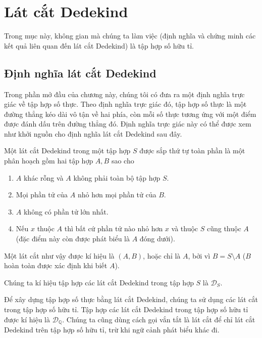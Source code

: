 \section{Lát cắt Dedekind}

Trong mục này, không gian mà chúng ta làm việc (định nghĩa và chứng minh các kết quả liên quan đến lát cắt Dedekind) là tập hợp số hữu tỉ.

\subsection{Định nghĩa lát cắt Dedekind}

Trong phần mở đầu của chương này, chúng tôi có đưa ra một định nghĩa trực giác về tập hợp số thực. Theo định nghĩa trực giác đó, tập hợp số thực là một đường thẳng kéo dài vô tận về hai phía, còn mỗi số thực tương ứng với một điểm được đánh dấu trên đường thẳng đó. Định nghĩa trực giác này có thể được xem như khởi nguồn cho định nghĩa lát cắt Dedekind sau đây.

\begin{definition}
    Một lát cắt Dedekind trong một tập hợp $S$ được sắp thứ tự toàn phần là một phân hoạch gồm hai tập hợp $A, B$ sao cho
    \begin{enumerate}[label={(DC\arabic*)}]
        \item $A$ khác rỗng và $A$ không phải toàn bộ tập hợp $S$.
        \item Mọi phần tử của $A$ nhỏ hơn mọi phần tử của $B$.
        \item $A$ không có phần tử lớn nhất.
        \item Nếu $x$ thuộc $A$ thì bất cứ phần tử nào nhỏ hơn $x$ và thuộc $S$ cũng thuộc $A$ (đặc điểm này còn được phát biểu là $A$ đóng dưới).
    \end{enumerate}

    Một lát cắt như vậy được kí hiệu là $(A, B)$, hoặc chỉ là $A$, bởi vì $B = S\setminus A$ ($B$ hoàn toàn được xác định khi biết $A$).

    Chúng ta kí hiệu tập hợp các lát cắt Dedekind trong tập hợp $S$ là $\mathscr{D}_{S}$.
\end{definition}

Để xây dựng tập hợp số thực bằng lát cắt Dedekind, chúng ta sử dụng các lát cắt trong tập hợp số hữu tỉ. Tập hợp các lát cắt Dedekind trong tập hợp số hữu tỉ được kí hiệu là $\mathscr{D}_{\mathbb{Q}}$. Chúng ta cũng dùng cách gọi vắn tắt là lát cắt để chỉ lát cắt Dedekind trên tập hợp số hữu tỉ, trừ khi ngữ cảnh phát biểu khác đi.

